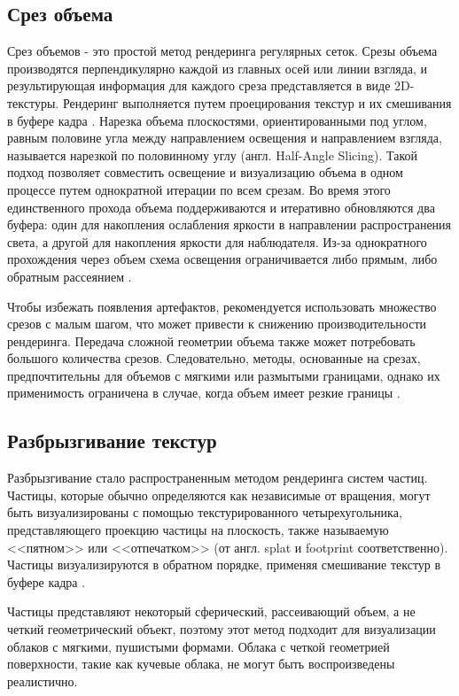 \subsection{Срез объема}
\label{slice}
Срез объемов - это простой метод рендеринга регулярных сеток. Срезы объема производятся перпендикулярно каждой из главных осей или линии взгляда, и результирующая информация для каждого среза представляется в виде 2D-текстуры. Рендеринг выполняется путем проецирования текстур и их смешивания в буфере кадра \cite{vs}. Нарезка объема плоскостями, ориентированными под углом, равным половине угла между направлением освещения и направлением взгляда, называется нарезкой по половинному углу (англ. Half-Angle Slicing). Такой подход позволяет совместить освещение и визуализацию объема в одном процессе путем однократной итерации по всем срезам. Во время этого единственного прохода объема поддерживаются и итеративно обновляются два буфера: один для накопления ослабления яркости в направлении распространения света, а другой для накопления яркости для наблюдателя. Из-за однократного прохождения через объем схема освещения ограничивается либо прямым, либо обратным рассеянием \cite{clouds}. 

Чтобы избежать появления артефактов, рекомендуется использовать множество срезов с малым шагом, что может привести к снижению производительности рендеринга. Передача сложной геометрии объема также может потребовать большого количества срезов. Следовательно, методы, основанные на срезах, предпочтительны для объемов с мягкими или размытыми границами, однако их применимость ограничена в случае, когда объем имеет резкие границы \cite{clouds}.

\subsection{Разбрызгивание текстур}
\label{splatting}
Разбрызгивание стало распространенным методом рендеринга систем частиц. Частицы, которые обычно определяются как независимые от вращения, могут быть визуализированы с помощью текстурированного четырехугольника, представляющего проекцию частицы на плоскость, также называемую <<пятном>> или <<отпечатком>> (от англ. splat и footprint соответственно). Частицы визуализируются в обратном порядке, применяя смешивание текстур в буфере кадра \cite{voxel, clouds}. 

Частицы представляют некоторый сферический, рассеивающий объем, а не четкий геометрический объект, поэтому этот метод подходит для визуализации облаков с мягкими, пушистыми формами. Облака с четкой геометрией поверхности, такие как кучевые облака, не могут быть воспроизведены реалистично.


